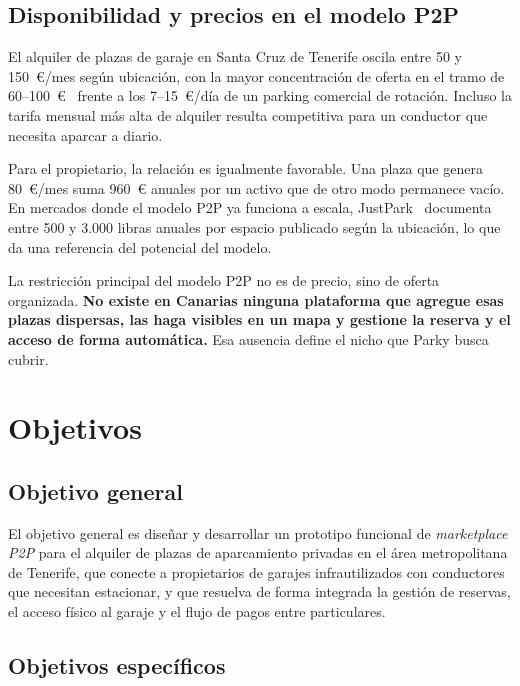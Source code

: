 \subsection{Disponibilidad y precios en el modelo P2P}

El alquiler de plazas de garaje en Santa Cruz de Tenerife oscila entre 50 y 150~€/mes según ubicación, con la mayor concentración de oferta en el tramo de 60--100~€~\cite{idealista2026garajes} frente a los 7--15~€/día de un parking comercial de rotación. Incluso la tarifa mensual más alta de alquiler resulta competitiva para un conductor que necesita aparcar a diario.

Para el propietario, la relación es igualmente favorable. Una plaza que genera 80~€/mes suma 960~€ anuales por un activo que de otro modo permanece vacío. En mercados donde el modelo P2P ya funciona a escala, JustPark~\cite{justpark2026earnings} documenta entre 500 y 3.000 libras anuales por espacio publicado según la ubicación, lo que da una referencia del potencial del modelo.

La restricción principal del modelo P2P no es de precio, sino de oferta organizada. \textbf{No existe en Canarias ninguna plataforma que agregue esas plazas dispersas, las haga visibles en un mapa y gestione la reserva y el acceso de forma automática.} Esa ausencia define el nicho que Parky busca cubrir.

\section{Objetivos}
\label{sec:objetivos}

\subsection*{Objetivo general}

El objetivo general es diseñar y desarrollar un prototipo funcional de \textit{marketplace P2P} para el alquiler de plazas de aparcamiento privadas en el área metropolitana de Tenerife, que conecte a propietarios de garajes infrautilizados con conductores que necesitan estacionar, y que resuelva de forma integrada la gestión de reservas, el acceso físico al garaje y el flujo de pagos entre particulares.

\subsection*{Objetivos específicos}

